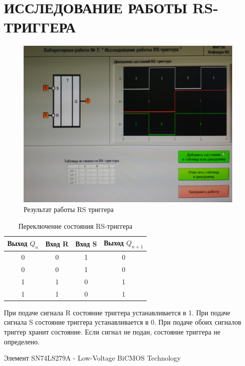 \section{ИССЛЕДОВАНИЕ РАБОТЫ RS-ТРИГГЕРА}

\begin{figure}[H]
	\centering
	\includegraphics[width=0.95\linewidth]{imgs/7/1}
	\caption{Результат работы RS триггера}
	\label{fig:7_}
\end{figure}

\begin{table}[H]
	\centering
	\caption{Переключение состояния RS-триггера}
	\label{tab:lab_07}
	\begin{tabular}{|c|c|c|c|}
		\hline
		Выход $Q_n$ & Вход R   & Вход S   & Выход $Q_{n+1}$ \\ \hline
		0           & 0        & 1        & 0               \\ \hline
		0           & 0        & 1        & 0               \\ \hline
		1           & 1        & 0        & 1               \\ \hline
		1           & 1        & 0        & 1               \\ \hline
	\end{tabular}
\end{table}

При подаче сигнала R состояние триггера устанавливается в 1.
При подаче сигнала S состояние триггера устанавливается в 0.
При подаче обоих сигналов триггер хранит состояние.
Если сигнал не подан, состояние триггера не определено.

Элемент SN74LS279A - Low-Voltage BiCMOS Technology

